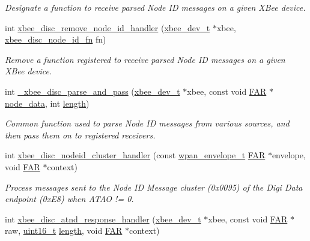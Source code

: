\begin{DoxyCompactItemize}
\begin{DoxyCompactList}\small\item\em Designate a function to receive parsed Node ID messages on a given X\+Bee device. \end{DoxyCompactList}\item 
int \hyperlink{group__xbee__discovery_ga091ae347ddae0bd1b54948714e9d6933}{xbee\+\_\+disc\+\_\+remove\+\_\+node\+\_\+id\+\_\+handler} (\hyperlink{structxbee__dev__t}{xbee\+\_\+dev\+\_\+t} $\ast$xbee, \hyperlink{group__xbee__device_ga64bf72cf58030a080f12f8916cd7d2a2}{xbee\+\_\+disc\+\_\+node\+\_\+id\+\_\+fn} fn)
\begin{DoxyCompactList}\small\item\em Remove a function registered to receive parsed Node ID messages on a given X\+Bee device. \end{DoxyCompactList}\item 
int \hyperlink{group__xbee__discovery_ga8db9bd798e5fb2f6c75037e0e9d3faff}{\+\_\+xbee\+\_\+disc\+\_\+parse\+\_\+and\+\_\+pass} (\hyperlink{structxbee__dev__t}{xbee\+\_\+dev\+\_\+t} $\ast$xbee, const void \hyperlink{group__hal_gaef060b3456fdcc093a7210a762d5f2ed}{F\+AR} $\ast$\hyperlink{group__xbee__discovery_ga85b75c5bbcd6d39fb6e2802f35f926ff}{node\+\_\+data}, int \hyperlink{group__zdo_gab2b3adeb2a67e656ff030b56727fd0ac}{length})
\begin{DoxyCompactList}\small\item\em Common function used to parse Node ID messages from various sources, and then pass them on to registered receivers. \end{DoxyCompactList}\item 
int \hyperlink{group__xbee__discovery_ga20bc82e8efc243e295c99c23948bed3b}{xbee\+\_\+disc\+\_\+nodeid\+\_\+cluster\+\_\+handler} (const \hyperlink{structwpan__envelope__t}{wpan\+\_\+envelope\+\_\+t} \hyperlink{group__hal_gaef060b3456fdcc093a7210a762d5f2ed}{F\+AR} $\ast$envelope, void \hyperlink{group__hal_gaef060b3456fdcc093a7210a762d5f2ed}{F\+AR} $\ast$context)
\begin{DoxyCompactList}\small\item\em Process messages sent to the Node ID Message cluster (0x0095) of the Digi Data endpoint (0x\+E8) when A\+T\+AO != 0. \end{DoxyCompactList}\item 
int \hyperlink{group__xbee__discovery_ga6d1190133ded980a4eeca2034508c8a5}{xbee\+\_\+disc\+\_\+atnd\+\_\+response\+\_\+handler} (\hyperlink{structxbee__dev__t}{xbee\+\_\+dev\+\_\+t} $\ast$xbee, const void \hyperlink{group__hal_gaef060b3456fdcc093a7210a762d5f2ed}{F\+AR} $\ast$raw, \hyperlink{group__hal__dos_ga5a8b2dc9e45a9ee81a94ef304fb62505}{uint16\+\_\+t} \hyperlink{group__zdo_gab2b3adeb2a67e656ff030b56727fd0ac}{length}, void \hyperlink{group__hal_gaef060b3456fdcc093a7210a762d5f2ed}{F\+AR} $\ast$context)

\end{DoxyCompactItemize}
